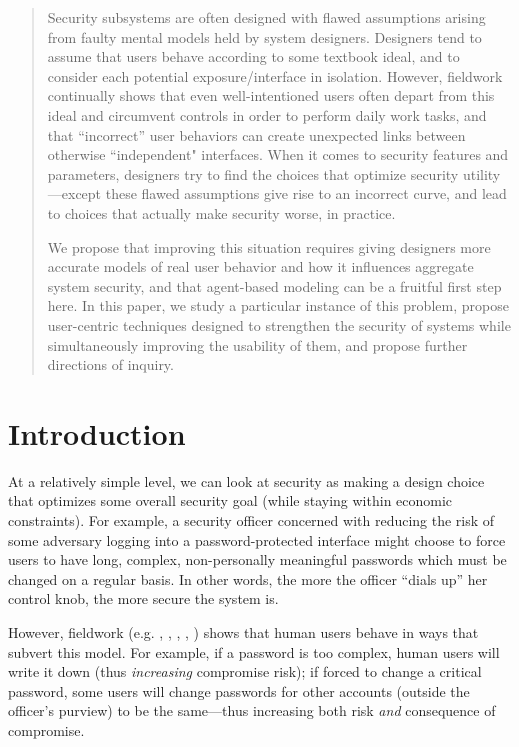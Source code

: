 \documentclass{acm_proc_article-sp}
\begin{document}
\begin{abstract}
Security subsystems are often designed with flawed assumptions arising from faulty
mental models held by system designers. 
Designers tend to assume that users behave according to some textbook ideal,
and to consider each potential exposure/interface in isolation.
However, fieldwork 
continually shows that even well-intentioned users often depart from this ideal
and circumvent controls in order to perform daily work tasks, and
that ``incorrect'' user behaviors can create unexpected links between 
otherwise ``independent" interfaces.
When it comes to security features and parameters,
designers try to find the choices that optimize security utility---except
these flawed assumptions give rise to an incorrect curve, and lead
to choices that actually make security worse, in practice.

We propose that improving this situation requires giving designers more
accurate models of real user behavior and how it influences aggregate system
security, and that agent-based modeling can be a fruitful 
first step here.
In this paper, we study a
particular instance of this problem, propose
user-centric techniques designed to strengthen the security of systems
while simultaneously improving the usability of them, and propose
further directions of inquiry.
\end{abstract}

\section{Introduction}

At a relatively simple level, we can look at security as making a
design choice that optimizes some overall security goal (while staying
within economic constraints).  For example, a security officer
concerned with reducing the risk of some adversary logging into a
password-protected interface might choose to force users to have long,
complex, non-personally meaningful passwords which must be changed on
a regular basis.  In other words, the more the officer ``dials up''
her control knob, the more secure the system is.

However, fieldwork (e.g. \cite{blythe2013circumvention}, \cite{DP00},
\cite{florencio2007large}, \cite{gaw2006password},
\cite{riley2006password}) shows that human users behave in ways that
subvert this model.  For example, if a password is too complex, human
users will write it down (thus {\em increasing} compromise risk); if
forced to change a critical password, some users will change passwords
for other accounts (outside the officer's purview) to be the
same---thus increasing both risk {\em and} consequence of compromise.
\end{document}
